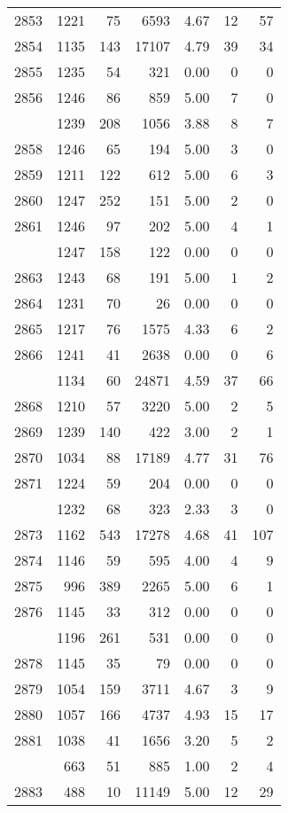 \documentclass[
]{article}
\begin{document}
\begin{table}
\begin{tabular}[t]{lrrrrrr}
2853 & 1221 & 75 & 6593 & 4.67 & 12 & 57\\
2854 & 1135 & 143 & 17107 & 4.79 & 39 & 34\\
2855 & 1235 & 54 & 321 & 0.00 & 0 & 0\\
2856 & 1246 & 86 & 859 & 5.00 & 7 & 0\\
\addlinespace
2857 & 1239 & 208 & 1056 & 3.88 & 8 & 7\\
2858 & 1246 & 65 & 194 & 5.00 & 3 & 0\\
2859 & 1211 & 122 & 612 & 5.00 & 6 & 3\\
2860 & 1247 & 252 & 151 & 5.00 & 2 & 0\\
2861 & 1246 & 97 & 202 & 5.00 & 4 & 1\\
\addlinespace
2862 & 1247 & 158 & 122 & 0.00 & 0 & 0\\
2863 & 1243 & 68 & 191 & 5.00 & 1 & 2\\
2864 & 1231 & 70 & 26 & 0.00 & 0 & 0\\
2865 & 1217 & 76 & 1575 & 4.33 & 6 & 2\\
2866 & 1241 & 41 & 2638 & 0.00 & 0 & 6\\
\addlinespace
2867 & 1134 & 60 & 24871 & 4.59 & 37 & 66\\
2868 & 1210 & 57 & 3220 & 5.00 & 2 & 5\\
2869 & 1239 & 140 & 422 & 3.00 & 2 & 1\\
2870 & 1034 & 88 & 17189 & 4.77 & 31 & 76\\
2871 & 1224 & 59 & 204 & 0.00 & 0 & 0\\
\addlinespace
2872 & 1232 & 68 & 323 & 2.33 & 3 & 0\\
2873 & 1162 & 543 & 17278 & 4.68 & 41 & 107\\
2874 & 1146 & 59 & 595 & 4.00 & 4 & 9\\
2875 & 996 & 389 & 2265 & 5.00 & 6 & 1\\
2876 & 1145 & 33 & 312 & 0.00 & 0 & 0\\
\addlinespace
2877 & 1196 & 261 & 531 & 0.00 & 0 & 0\\
2878 & 1145 & 35 & 79 & 0.00 & 0 & 0\\
2879 & 1054 & 159 & 3711 & 4.67 & 3 & 9\\
2880 & 1057 & 166 & 4737 & 4.93 & 15 & 17\\
2881 & 1038 & 41 & 1656 & 3.20 & 5 & 2\\
\addlinespace
2882 & 663 & 51 & 885 & 1.00 & 2 & 4\\
2883 & 488 & 10 & 11149 & 5.00 & 12 & 29\\

\end{tabular}
\end{table}
\end{document}
